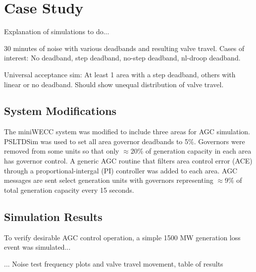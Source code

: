 \section{Case Study}
Explanation of simulations to do...

30 minutes of noise with various deadbands and resulting valve travel.
Cases of interest:
No deadband, step deadband, no-step deadband, nl-droop deadband.

Universal acceptance sim:
At least 1 area with a step deadband, others with linear or no deadband.
Should show unequal distribution of valve travel.

\subsection{System Modifications}
The miniWECC system was modified to include three areas for AGC simulation.
PSLTDSim was used to set all area governor deadbands to 5\%.
Governors were removed from some units so that only $\approx$20\% of generation capacity in each area has governor control.
A generic AGC routine that filters area control error (ACE) through a proportional-intergal (PI)  controller was added to each area.
AGC messages are sent select generation units with governors representing $\approx$9\% of total generation capacity every 15 seconds.

\subsection{Simulation Results}
To verify desirable AGC control operation, a simple 1500 MW generation loss event was simulated...

...
Noise test frequency plots and valve travel movement, table of results